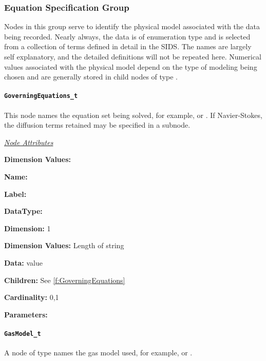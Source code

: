\subsubsection{Equation Specification Group}

Nodes in this group serve to identify the physical model associated
with the data being recorded. Nearly always, the data is of enumeration
type and is selected from a collection of terms defined in detail in
the SIDS.  The names are largely self explanatory, and the detailed
definitions will not be repeated here. Numerical values associated with
the physical model depend on the type of modeling being chosen and are
generally stored in child nodes of type .

\paragraph{\texttt{GoverningEquations\_t}}

This node names the equation set being solved, for example,
 or . If Navier-Stokes, the
diffusion terms retained may be specified in a 
subnode.

\textit{\uline{Node Attributes}}
\begin{Ventryic}{\textbf{Dimension Values:}}
\item [\textbf{Name:}]
\item [\textbf{Label:}]
\item [\textbf{DataType:}]
\item [\textbf{Dimension:}]
      1
\item [\textbf{Dimension Values:}]
      Length of string
\item [\textbf{Data:}]
       value
\item [\textbf{Children:}]
      See \autoref{f:GoverningEquations}
\item [\textbf{Cardinality:}]
      0,1
\item [\textbf{Parameters:}]
\end{Ventryic}

\paragraph{\texttt{GasModel\_t}}

A node of type  names the gas model used, for example,
 or .

